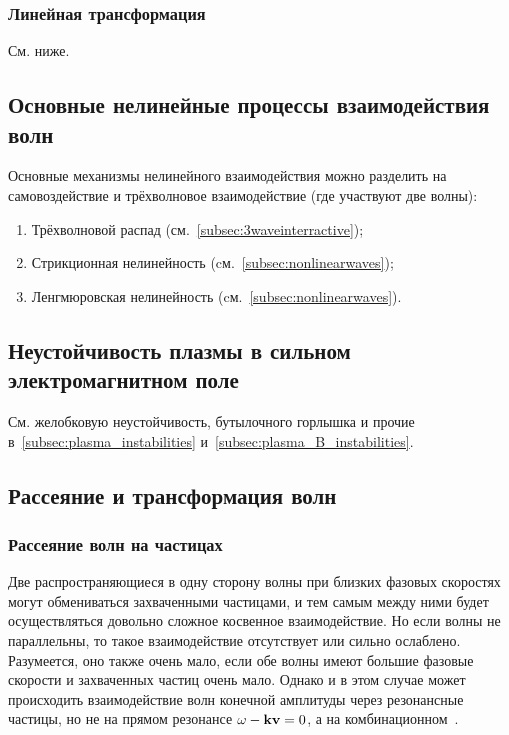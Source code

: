 \documentclass[10pt, a4paper]{article}
\begin{document}
\subsubsection{Линейная трансформация}

См. ниже.

\subsection{Основные нелинейные процессы взаимодействия волн}

Основные механизмы нелинейного взаимодействия можно разделить на самовоздействие и трёхволновое взаимодействие (где участвуют две волны):

\begin{enumerate}
	
	\item Трёхволновой распад (см.~\ref{subsec:3waveinterractive}); 
	
	\item Стрикционная нелинейность (cм.~\ref{subsec:nonlinearwaves});
	
	\item Ленгмюровская нелинейность (cм.~\ref{subsec:nonlinearwaves}).
	
\end{enumerate}

\subsection{Неустойчивость плазмы в сильном электромагнитном поле}

См. желобковую неустойчивость, бутылочного горлышка и прочие в~\ref{subsec:plasma_instabilities} и~\ref{subsec:plasma_B_instabilities}.

\subsection{Рассеяние и трансформация волн}

\subsubsection{Рассеяние волн на частицах}

Две распространяющиеся в одну сторону волны при близких фазовых скоростях могут обмениваться захваченными частицами, и тем самым между ними будет осуществляться довольно сложное косвенное взаимодействие. Но если волны не параллельны, то такое взаимодействие отсутствует или сильно ослаблено. Разумеется, оно также очень мало, если обе волны имеют большие фазовые скорости и захваченных частиц очень мало. Однако и в этом случае может происходить взаимодействие волн конечной амплитуды через резонансные частицы, но не на прямом резонансе $\omega-\vb{k}\vb{v}=0$, а на комбинационном~\cite{kadomtsev}.
\end{document}

